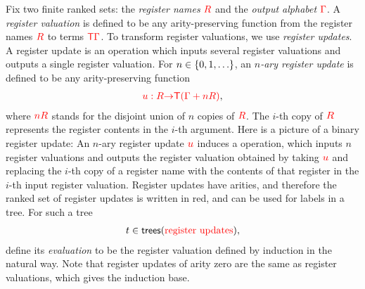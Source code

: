 Fix two finite ranked sets: the \emph{register names} ${{\color{red}{R}}}$ and the \emph{output alphabet} ${\color{red}{\Gamma}}$.
A \emph{register valuation} is defined to be any arity-preserving function from the register names ${{\color{red}{R}}}$ to terms ${\color{red}{\mathsf T}} {\color{red}{\Gamma}}$. 
To transform register valuations, we use \emph{register updates}.  A register update is an operation which inputs several  register valuations and outputs a single register valuation. For  $n \in \{0,1,\ldots\}$, an \emph{$n$-ary register update}  is defined to be any arity-preserving function
\begin{align*}
    {\color{red}{u : {{\color{red}{R}}}{\color{red}{\to}}{\color{red}{\mathsf T}}( {\color{red}{\Gamma}}+ n{{\color{red}{R}}})}},
\end{align*}
where ${\color{red}{nR}}$ stands for the disjoint union of $n$ copies of ${{\color{red}{R}}}$. The $i$-th copy of ${{\color{red}{R}}}$ represents the register contents in the $i$-th argument.
Here is a picture of a binary register update:
An $n$-ary register update ${\color{red}{u}}$ induces a operation, which inputs  $n$ register valuations and  outputs the  register valuation obtained by  taking ${\color{red}{u}}$ and replacing the $i$-th copy of a register name with the  contents of that register in the $i$-th input register valuation. 
Register updates have arities, and therefore the ranked set of register updates is written in red, and can be used for labels in a tree. For such a  tree 
\begin{align*}
    t \in  \mathsf {trees}({\color{red}{\text{register updates}}}),
\end{align*}
define its \emph{evaluation} to be the register valuation defined by induction in the natural way. Note that register updates of arity zero are the same as register valuations, which gives the induction base.


